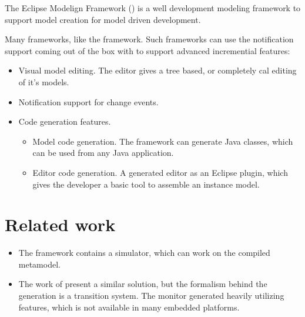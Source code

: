 The Eclipse Modelign Framework (\emf) is a well development modeling framework to support model creation for model driven development.

Many frameworks, like the \viatra{} framework. Such frameworks can use the notification support coming out of the box with \emf{} to support advanced incremential features:
\begin{itemize}
	\item Visual model editing. The \emf{} editor gives a tree based, or completely cal editing of it's models.
	\item Notification support for change events.
	\item Code generation features.
	      \begin{itemize}
	      	\item Model code generation. The framework can generate Java classes, which can be used from any Java application.
	      	\item Editor code generation. A generated editor as an Eclipse plugin, which gives the developer a basic tool to assemble an instance model.
	      \end{itemize}
\end{itemize}

\section{Related work}

\begin{itemize}
	\item The \viatrac{} framework contains a simulator, which can work on the compiled metamodel.
	\item The work of \cite{TDK2015} present a similar solution, but the formalism behind the generation is a transition system. The monitor generated heavily utilizing  features, which is not available in many embedded platforms.
	
\end{itemize}

